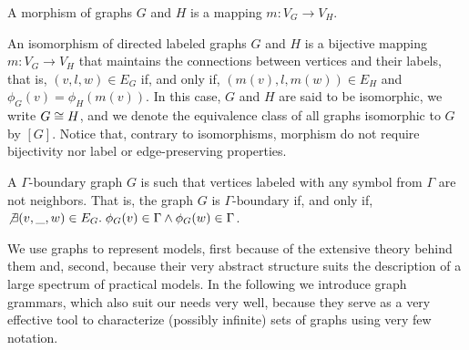 \begin{definition}
	\label{def:morphism}
	A morphism of graphs $G$ and $H$ is a mapping $m: V_G \to V_H$.
\end{definition}

\begin{definition}
	An isomorphism of directed labeled graphs $G$ and $H$ is a bijective mapping $m: V_G \to V_H$ that maintains the connections between vertices and their labels, that is, $(v,l,w) \in E_G$ if, and only if,  $(m(v),l,m(w)) \in E_H$ and $\phi_G(v) = \phi_H(m(v))$. In this case, $G$ and $H$ are said to be isomorphic, we write $G \isomorph H$, and we denote the equivalence class of all graphs isomorphic to $G$ by $[G]$.
	Notice that, contrary to isomorphisms, morphism do not require bijectivity nor label or edge-preserving properties.
\end{definition}

\begin{definition}
	A $\Gamma\text{-boundary}$ graph $G$ is such that vertices labeled with any symbol from $\Gamma$ are not neighbors. That is, the graph $G$ is $\Gamma\text{-boundary}$ if, and only if, $\not\exists (v,\_,w) \in E_G \. \phi_G(v) \in \Gamma \land \phi_G(w) \in \Gamma$.
\end{definition}

We use graphs to represent models, first because of the extensive theory behind them and, second, because their very abstract structure suits the description of a large spectrum of practical models. In the following we introduce graph grammars, which also suit our needs very well, because they serve as a very effective tool to characterize (possibly infinite) sets of graphs using very few notation.

